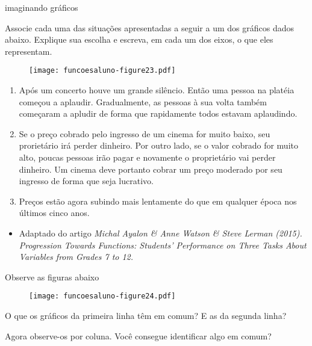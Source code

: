 \documentclass[extrafontsizes, twoside, 11pt, openright, final]{memoir}
\begin{document}
\begin{task}{ imaginando gráficos}

	Associe cada uma das situações apresentadas a seguir a um dos gráficos dados abaixo. Explique sua escolha e escreva, em cada um dos eixos, o que eles representam.
	\begin{figure}[H]
		\begin{center}
			\centering

			\texttt{[image: funcoesaluno-figure23.pdf]}
		\end{center}
	\end{figure}

	\begin{enumerate}[label=($\Roman*$)]
		\item Após um concerto houve um grande silêncio. Então uma pessoa na platéia começou a aplaudir. Gradualmente, as pessoas à sua volta também começaram a apludir de forma que rapidamente todos estavam aplaudindo.

		\item Se o preço cobrado pelo ingresso de um cinema for muito baixo, seu prorietário irá perder dinheiro. Por outro lado, se o valor cobrado for muito alto, poucas pessoas irão pagar e novamente o proprietário vai perder dinheiro. Um cinema deve portanto cobrar um preço moderado por seu ingresso de forma que seja lucrativo.

		\item Preços estão agora subindo mais lentamente do que em qualquer época nos últimos cinco anos.
	\end{enumerate}
	\begin{itemize}
		\item Adaptado do artigo \emph{Michal Ayalon \& Anne Watson \& Steve Lerman (2015). Progression Towards Functions: Students’ Performance on Three Tasks About Variables from Grades 7 to 12.}
	\end{itemize}
\end{task}

\clearpage
\begin{reflection}
	Observe as figuras abaixo
	\begin{figure}[H]
		\begin{center}
			\centering

			\texttt{[image: funcoesaluno-figure24.pdf]}
		\end{center}
	\end{figure}

	O que os gráficos da primeira linha têm em comum? E as da segunda linha?

	Agora observe-os por coluna. Você consegue identificar algo em comum?
\end{reflection}
\end{document}
